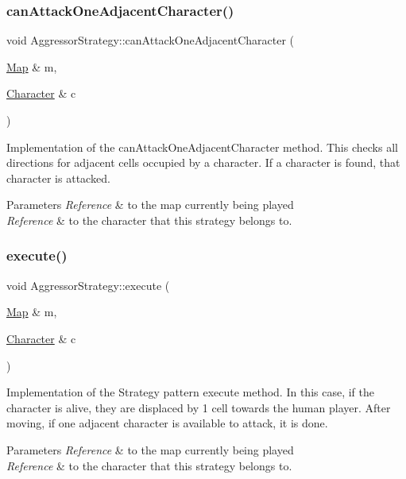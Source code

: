 \subsubsection{\texorpdfstring{can\+Attack\+One\+Adjacent\+Character()}{canAttackOneAdjacentCharacter()}}
{\footnotesize\ttfamily void Aggressor\+Strategy\+::can\+Attack\+One\+Adjacent\+Character (\begin{DoxyParamCaption}\item[{\hyperlink{class_map}{Map} \&}]{m,  }\item[{\hyperlink{class_character}{Character} \&}]{c }\end{DoxyParamCaption})}

Implementation of the can\+Attack\+One\+Adjacent\+Character method. This checks all directions for adjacent cells occupied by a character. If a character is found, that character is attacked. 
\begin{DoxyParams}{Parameters}
{\em Reference} & to the map currently being played \\
\hline
{\em Reference} & to the character that this strategy belongs to. \\
\hline
\end{DoxyParams}
\hypertarget{class_aggressor_strategy_a64de03f063f8b195da7134965148f1c8}{}\label{class_aggressor_strategy_a64de03f063f8b195da7134965148f1c8} 
\subsubsection{\texorpdfstring{execute()}{execute()}}
{\footnotesize\ttfamily void Aggressor\+Strategy\+::execute (\begin{DoxyParamCaption}\item[{\hyperlink{class_map}{Map} \&}]{m,  }\item[{\hyperlink{class_character}{Character} \&}]{c }\end{DoxyParamCaption})\hspace{0.3cm}{\ttfamily [virtual]}}

Implementation of the Strategy pattern execute method. In this case, if the character is alive, they are displaced by 1 cell towards the human player. After moving, if one adjacent character is available to attack, it is done. 
\begin{DoxyParams}{Parameters}
{\em Reference} & to the map currently being played \\
\hline
{\em Reference} & to the character that this strategy belongs to. \\
\hline
\end{DoxyParams}


